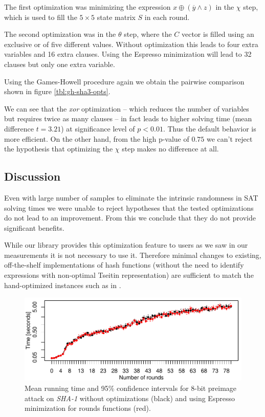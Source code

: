 The first optimization was minimizing the expression $x \oplus (\overline{y} \land z)$ in the $\chi$ step, which is used to fill the $5\times 5$ state matrix $S$ in each round.

The second optimization was in the $\theta$ step, where the $C$ vector is filled using an exclusive or of five different values.
Without optimization this leads to four extra variables and 16 extra clauses.
Using the Espresso minimization will lead to 32 clauses but only one extra variable.

Using the Games-Howell procedure again we obtain the pairwise comparison shown in figure \ref{tbl:gh-sha3-opts}.

We can see that the \emph{xor} optimization -- which reduces the number of variables but requires twice as many clauses -- in fact leads to higher solving time (mean difference $t=3.21$) at significance level of $p < 0.01$.
Thus the default behavior is more efficient.
On the other hand, from the high p-value of $0.75$ we can't reject the hypothesis that optimizing the $\chi$ step makes no difference at all.

\subsection{Discussion}
Even with large number of samples to eliminate the intrinsic randomness in SAT solving times we were unable to reject hypotheses that the tested optimizations do not lead to an improvement.
From this we conclude that they do not provide significant benefits.

While our library provides this optimization feature to users as we saw in our measurements it is not necessary to use it.
Therefore minimal changes to existing, off-the-shelf implementations of hash functions (without the need to identify expressions with non-optimal Tseitin representation) are sufficient to match the hand-optimized instances such as in \cite{nossum2012sat}.

\begin{figure}	
\centering \includegraphics{figures/opt-sha1/sha1-32bit-8bitref-cmp-espresso.pdf}
\caption{Mean running time and 95\% confidence intervals for $8$-bit preimage attack on \emph{SHA-1} without optimizations (black) and using Espresso minimization for rounds functions (red).}
\label{fig:opt-sha1-cmp-espresso}
\end{figure}

